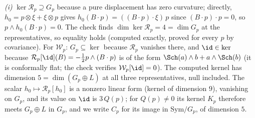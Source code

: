 \emph{(i)} $\ker \mathcal{R}_{p} \supseteq G_{p}$ because a pure displacement has zero curvature; directly, $h_{0} = p \otimes \xi + \xi \otimes p$ gives $h_{0}(B \cdot p) = ((B \cdot p) \cdot \xi)\,p$ since $(B \cdot p) \cdot p = 0$, so $p \wedge h_{0}(B \cdot p) = 0$. The check finds $\dim\ker\mathcal{R}_{p} = 4 = \dim G_{p}$ at the representatives, so equality holds (computed exactly, proved for every $p$ by covariance). For $\mathcal{W}_{p}$: $G_{p} \subseteq \ker$ because $\mathcal{R}_{p}$ vanishes there, and $\id \in \ker$ because $\mathcal{R}_{p}[\id](B) = -\tfrac12 p \wedge (B \cdot p)$ is of the form $\Sch(a) \wedge b + a \wedge \Sch(b)$ (it is conformally flat; the check verifies $\mathcal{W}_{p}[\id] = 0$). The computed kernel has dimension $5 = \dim(G_{p} \oplus L)$ at all three representatives, null included. The scalar $h_{0} \mapsto \mathcal{R}_{p}[h_{0}]$ is a nonzero linear form (kernel of dimension $9$), vanishing on $G_{p}$, and its value on $\id$ is $3\,Q(p)$; for $Q(p) \neq 0$ its kernel $K_{p}$ therefore meets $G_{p} \oplus L$ in $G_{p}$, and we write $C_{p}$ for its image in $\mathrm{Sym}/G_{p}$, of dimension $5$.

